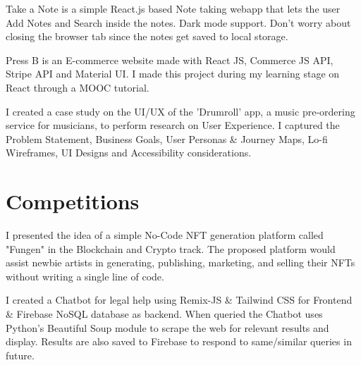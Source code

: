 \documentclass[]{plushcv}
\begin{document}
\begin{minipage}[t]{0.70\textwidth}
\begin{tightemize}
\item Take a Note is a simple React.js based Note taking webapp that lets the user Add Notes and Search inside the notes. Dark mode support. Don't worry about closing the browser tab since the notes get saved to local storage.
\end{tightemize}
\sectionsep

\begin{tightemize}
\item Press B is an E-commerce website made with React JS, Commerce JS API, Stripe API and Material UI. I made this project during my learning stage on React through a MOOC tutorial.
\end{tightemize}
\sectionsep

\begin{tightemize}
\item I created a case study on the UI/UX of the 'Drumroll' app, a music pre-ordering service for musicians, to perform research on User Experience. I captured the Problem Statement, Business Goals, User Personas \& Journey Maps, Lo-fi Wireframes, UI Designs and Accessibility considerations.
\end{tightemize}
\sectionsep


\section{Competitions}

\begin{tightemize}
\item I presented the idea of a simple No-Code NFT generation platform called "Fungen" in the Blockchain and Crypto track. The proposed platform would assist newbie artists in generating, publishing, marketing, and selling their NFTs without writing a single line of code.
\end{tightemize}
\sectionsep

\begin{tightemize}
\item I created a Chatbot for legal help using Remix-JS \& Tailwind CSS for Frontend \& Firebase NoSQL database as backend. When queried the Chatbot uses Python's Beautiful Soup module to scrape the web for relevant results and display. Results are also saved to Firebase to respond to same/similar queries in future. 
\end{tightemize}
\sectionsep


\end{minipage}
\end{document}
